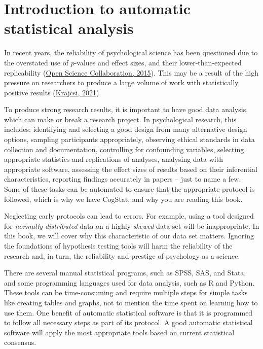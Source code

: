\documentclass[
  11pt,
]{book}
\theoremstyle{indenteddefinition}
\theoremstyle{indenteddefinition}
\theoremstyle{definition}
\theoremstyle{definition}
\theoremstyle{remark}
\begin{document}
\hypertarget{autostat}{%
\chapter{Introduction to automatic statistical analysis}\label{autostat}}

In recent years, the reliability of psychological science has been questioned due to the overstated use of \(p\)-values and effect sizes, and their lower-than-expected replicability (\protect\hyperlink{ref-open_science_collaboration_estimating_2015}{Open Science Collaboration, 2015}). This may be a result of the high pressure on researchers to produce a large volume of work with statistically positive results (\protect\hyperlink{ref-krajcsi_advancing_2021}{Krajcsi, 2021}).

To produce strong research results, it is important to have good data analysis, which can make or break a research project. In psychological research, this includes: identifying and selecting a good design from many alternative design options, sampling participants appropriately, observing ethical standards in data collection and documentation, controlling for confounding variables, selecting appropriate statistics and replications of analyses, analysing data with appropriate software, assessing the effect sizes of results based on their inferential characteristics, reporting findings accurately in papers -- just to name a few. Some of these tasks can be automated to ensure that the appropriate protocol is followed, which is why we have CogStat, and why you are reading this book.

Neglecting early protocols can lead to errors. For example, using a tool designed for \emph{normally distributed} data on a highly \emph{skewed} data set will be inappropriate. In this book, we will cover why this characteristic of our data set matters. Ignoring the foundations of hypothesis testing tools will harm the reliability of the research and, in turn, the reliability and prestige of psychology as a science.

There are several manual statistical programs, such as SPSS, SAS, and Stata, and some programming languages used for data analysis, such as R and Python. These tools can be time-consuming and require multiple steps for simple tasks like creating tables and graphs, not to mention the time spent on learning how to use them. One benefit of automatic statistical software is that it is programmed to follow all necessary steps as part of its protocol. A good automatic statistical software will apply the most appropriate tools based on current statistical consensus.
\end{document}
